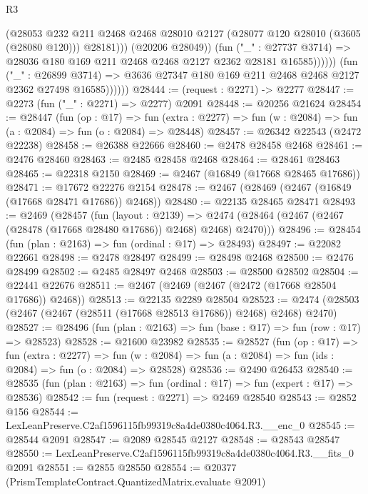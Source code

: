 \begin{lexlean}{R3}
\begin{coremodule}
                              (@28053
                                @232
                                @211
                                @2468
                                @2468
                                @28010
                                @2127
                                (@28077 @120 @28010 (@3605 (@28080 @120)))
                                @28181)))
                          (@20206 @28049))
                        (fun ("_" : @27737 @3714) =>
                        @28036 @180 @169 @211 @2468 @2468 @2127 @2362 @28181 @16585))))))
              (fun ("_" : @26899 @3714) =>
              @3636 @27347 @180 @169 @211 @2468 @2468 @2127 @2362 @27498 @16585))))))
@28444 := (request : @2271) -> @2277
@28447 := @2273 (fun ("_" : @2271) => @2277) @2091
@28448 := @20256 @21624
@28454 := @28447
    (fun (op : @17) =>
    fun (extra : @2277) => fun (w : @2084) => fun (a : @2084) => fun (o : @2084) => @28448)
@28457 := @26342 @22543 (@2472 @22238)
@28458 := @26388 @22666
@28460 := @2478 @28458 @2468
@28461 := @2476 @28460
@28463 := @2485 @28458 @2468
@28464 := @28461 @28463
@28465 := @22318 @2150
@28469 := @2467 (@16849 (@17668 @28465 @17686))
@28471 := @17672 @22276 @2154
@28478 := @2467 (@28469 (@2467 (@16849 (@17668 @28471 @17686)) @2468))
@28480 := @22135 @28465 @28471
@28493 := @2469
    (@28457
      (fun (layout : @2139) =>
      @2474 (@28464 (@2467 (@2467 (@28478 (@17668 @28480 @17686)) @2468) @2468) @2470)))
@28496 := @28454 (fun (plan : @2163) => fun (ordinal : @17) => @28493)
@28497 := @22082 @22661
@28498 := @2478 @28497
@28499 := @28498 @2468
@28500 := @2476 @28499
@28502 := @2485 @28497 @2468
@28503 := @28500 @28502
@28504 := @22441 @22676
@28511 := @2467 (@2469 (@2467 (@2472 (@17668 @28504 @17686)) @2468))
@28513 := @22135 @2289 @28504
@28523 := @2474 (@28503 (@2467 (@2467 (@28511 (@17668 @28513 @17686)) @2468) @2468) @2470)
@28527 := @28496 (fun (plan : @2163) => fun (base : @17) => fun (row : @17) => @28523)
@28528 := @21600 @23982
@28535 := @28527
    (fun (op : @17) =>
    fun (extra : @2277) =>
    fun (w : @2084) => fun (a : @2084) => fun (ids : @2084) => fun (o : @2084) => @28528)
@28536 := @2490 @26453
@28540 := @28535 (fun (plan : @2163) => fun (ordinal : @17) => fun (expert : @17) => @28536)
@28542 := fun (request : @2271) => @2469 @28540
@28543 := @2852 @156
@28544 := LexLeanPreserve.C2af1596115fb99319c8a4de0380c4064.R3.__enc_0
@28545 := @28544 @2091
@28547 := @2089 @28545 @2127
@28548 := @28543 @28547
@28550 := LexLeanPreserve.C2af1596115fb99319c8a4de0380c4064.R3.__fits_0 @2091
@28551 := @2855 @28550
@28554 := @20377 (PrismTemplateContract.QuantizedMatrix.evaluate @2091)

\end{coremodule}
\end{lexlean}

